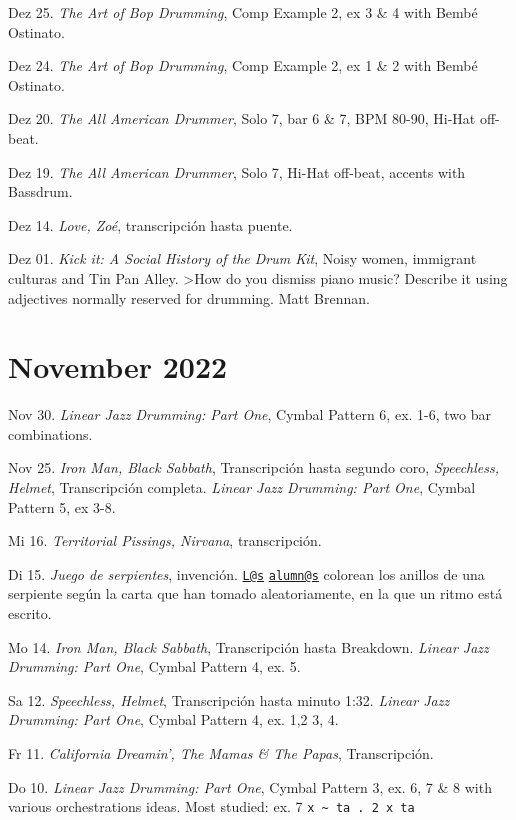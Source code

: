 \documentclass[
]{book}
\begin{document}
Dez 25. \emph{The Art of Bop Drumming}, Comp Example 2, ex 3 \& 4 with Bembé Ostinato.

Dez 24. \emph{The Art of Bop Drumming}, Comp Example 2, ex 1 \& 2 with Bembé Ostinato.

Dez 20. \emph{The All American Drummer}, Solo 7, bar 6 \& 7, BPM 80-90, Hi-Hat off-beat.

Dez 19. \emph{The All American Drummer}, Solo 7, Hi-Hat off-beat, accents with Bassdrum.

Dez 14. \emph{Love, Zoé}, transcripción hasta puente.

Dez 01. \emph{Kick it: A Social History of the Drum Kit}, Noisy women, immigrant culturas and Tin Pan Alley.
\textgreater How do you dismiss piano music? Describe it using adjectives normally reserved for drumming. Matt Brennan.

\hypertarget{november-2022}{%
\section*{November 2022}\label{november-2022}}

Nov 30. \emph{Linear Jazz Drumming: Part One}, Cymbal Pattern 6, ex. 1-6, two bar combinations.

Nov 25. \emph{Iron Man, Black Sabbath}, Transcripción hasta segundo coro, \emph{Speechless, Helmet}, Transcripción completa. \emph{Linear Jazz Drumming: Part One}, Cymbal Pattern 5, ex 3-8.

Mi 16. \emph{Territorial Pissings, Nirvana}, transcripción.

Di 15. \emph{Juego de serpientes}, invención. \href{mailto:L@s}{\nolinkurl{L@s}} \href{mailto:alumn@s}{\nolinkurl{alumn@s}} colorean los anillos de una serpiente según la carta que han tomado aleatoriamente, en la que un ritmo está escrito.

Mo 14. \emph{Iron Man, Black Sabbath}, Transcripción hasta Breakdown. \emph{Linear Jazz Drumming: Part One}, Cymbal Pattern 4, ex. 5.

Sa 12. \emph{Speechless, Helmet}, Transcripción hasta minuto 1:32. \emph{Linear Jazz Drumming: Part One}, Cymbal Pattern 4, ex. 1,2 3, 4.

Fr 11. \emph{California Dreamin', The Mamas \& The Papas}, Transcripción.

Do 10. \emph{Linear Jazz Drumming: Part One}, Cymbal Pattern 3, ex. 6, 7 \& 8 with various orchestrations ideas. Most studied: ex. 7 \texttt{x\ \textasciitilde{}\ ta\ .\ 2\ x\ ta}
\end{document}
